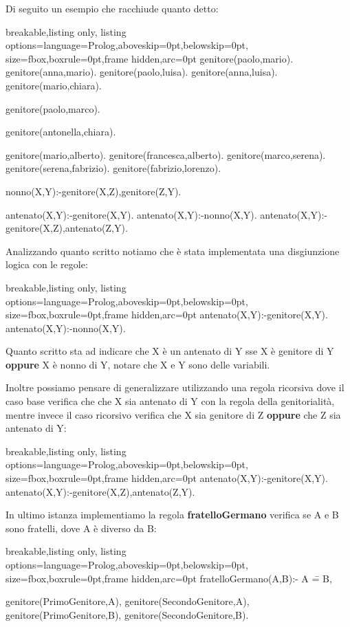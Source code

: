 Di seguito un esempio che racchiude quanto detto:
\begin{tcblisting}{breakable,listing only,
  listing options={language=Prolog,aboveskip=0pt,belowskip=0pt},
  size=fbox,boxrule=0pt,frame hidden,arc=0pt}
genitore(paolo,mario).
genitore(anna,mario).
genitore(paolo,luisa).
genitore(anna,luisa).
genitore(mario,chiara). 

genitore(paolo,marco).
                       
genitore(antonella,chiara).

genitore(mario,alberto).
genitore(francesca,alberto).
genitore(marco,serena).
genitore(serena,fabrizio).
genitore(fabrizio,lorenzo).

nonno(X,Y):-genitore(X,Z),genitore(Z,Y).

antenato(X,Y):-genitore(X,Y).
antenato(X,Y):-nonno(X,Y).
antenato(X,Y):-genitore(X,Z),antenato(Z,Y).
\end{tcblisting}

Analizzando quanto scritto notiamo che è stata implementata una disgiunzione logica con le regole:
\begin{tcblisting}{breakable,listing only,
  listing options={language=Prolog,aboveskip=0pt,belowskip=0pt},
  size=fbox,boxrule=0pt,frame hidden,arc=0pt}
antenato(X,Y):-genitore(X,Y).
antenato(X,Y):-nonno(X,Y).
\end{tcblisting}
Quanto scritto sta ad indicare che X è un antenato di Y sse X è genitore di Y \textbf{oppure} X è nonno di Y, notare che X e Y sono delle variabili.

Inoltre possiamo pensare di generalizzare utilizzando una regola ricorsiva dove il caso base verifica che che X sia antenato di Y con la regola della genitorialità, mentre invece il caso ricorsivo verifica che X sia genitore di Z \textbf{oppure} che Z sia antenato di Y:
\begin{tcblisting}{breakable,listing only,
  listing options={language=Prolog,aboveskip=0pt,belowskip=0pt},
  size=fbox,boxrule=0pt,frame hidden,arc=0pt}
antenato(X,Y):-genitore(X,Y).
antenato(X,Y):-genitore(X,Z),antenato(Z,Y).
\end{tcblisting}

In ultimo istanza implementiamo la regola \textbf{fratelloGermano} verifica se A e B sono fratelli, dove A è diverso da B:
\begin{tcblisting}{breakable,listing only,
  listing options={language=Prolog,aboveskip=0pt,belowskip=0pt},
  size=fbox,boxrule=0pt,frame hidden,arc=0pt}
fratelloGermano(A,B):-
    A \== B,
    
    genitore(PrimoGenitore,A),
    genitore(SecondoGenitore,A),
    genitore(PrimoGenitore,B),
    genitore(SecondoGenitore,B).
\end{tcblisting}